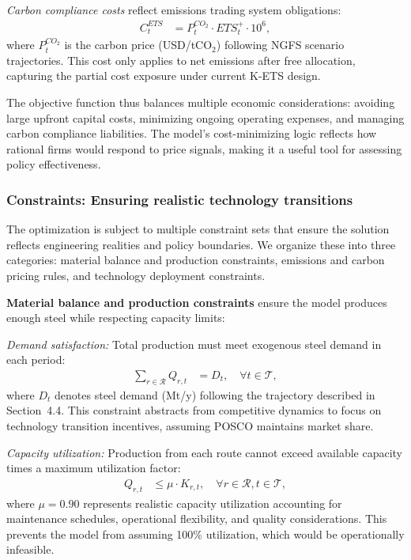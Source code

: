 \documentclass[preprint,1p,authoryear]{elsarticle}
\begin{document}
\textit{Carbon compliance costs} reflect emissions trading system obligations:
\begin{align}
C^{ETS}_t &= P^{CO_2}_t \cdot ETS_t^+ \cdot 10^6, \label{eq:ets}
\end{align}
where $P^{CO_2}_t$ is the carbon price (USD/tCO$_2$) following NGFS scenario trajectories. This cost only applies to net emissions after free allocation, capturing the partial cost exposure under current K-ETS design.

The objective function thus balances multiple economic considerations: avoiding large upfront capital costs, minimizing ongoing operating expenses, and managing carbon compliance liabilities. The model's cost-minimizing logic reflects how rational firms would respond to price signals, making it a useful tool for assessing policy effectiveness.

\subsubsection{Constraints: Ensuring realistic technology transitions}

The optimization is subject to multiple constraint sets that ensure the solution reflects engineering realities and policy boundaries. We organize these into three categories: material balance and production constraints, emissions and carbon pricing rules, and technology deployment constraints.

\textbf{Material balance and production constraints} ensure the model produces enough steel while respecting capacity limits:

\textit{Demand satisfaction:} Total production must meet exogenous steel demand in each period:
\begin{align}
\sum_{r \in \mathcal{R}} Q_{r,t} &= D_t, \quad \forall t \in \mathcal{T}, \label{eq:demand}
\end{align}
where $D_t$ denotes steel demand (Mt/y) following the trajectory described in Section~4.4. This constraint abstracts from competitive dynamics to focus on technology transition incentives, assuming POSCO maintains market share.

\textit{Capacity utilization:} Production from each route cannot exceed available capacity times a maximum utilization factor:
\begin{align}
Q_{r,t} &\le \mu \cdot K_{r,t}, \quad \forall r \in \mathcal{R}, t \in \mathcal{T}, \label{eq:utilization}
\end{align}
where $\mu = 0.90$ represents realistic capacity utilization accounting for maintenance schedules, operational flexibility, and quality considerations. This prevents the model from assuming 100\% utilization, which would be operationally infeasible.
\end{document}
